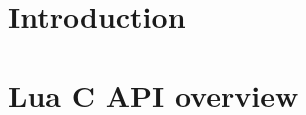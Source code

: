 \documentclass[polish, english]{iithesis}
\author{Mateusz Łuczyński}
\date{\today}
\begin{document}
\chapter{Introduction}
\chapter{Lua C API overview}
\end{document}
